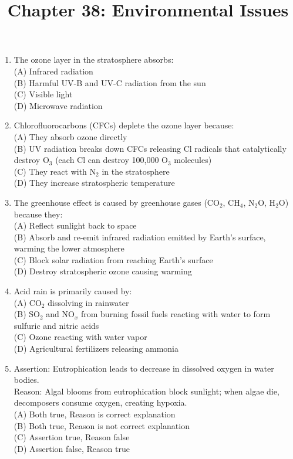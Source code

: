 \documentclass{article}
\begin{document}
\newpage
\title{Chapter 38: Environmental Issues}
\maketitle

\begin{enumerate}[label=Q\arabic*.]

\item The ozone layer in the stratosphere absorbs:
\\(A) Infrared radiation
\\(B) Harmful UV-B and UV-C radiation from the sun
\\(C) Visible light
\\(D) Microwave radiation

\item Chlorofluorocarbons (CFCs) deplete the ozone layer because:
\\(A) They absorb ozone directly
\\(B) UV radiation breaks down CFCs releasing Cl radicals that catalytically destroy O$_3$ (each Cl can destroy 100,000 O$_3$ molecules)
\\(C) They react with N$_2$ in the stratosphere
\\(D) They increase stratospheric temperature

\item The greenhouse effect is caused by greenhouse gases (CO$_2$, CH$_4$, N$_2$O, H$_2$O) because they:
\\(A) Reflect sunlight back to space
\\(B) Absorb and re-emit infrared radiation emitted by Earth's surface, warming the lower atmosphere
\\(C) Block solar radiation from reaching Earth's surface
\\(D) Destroy stratospheric ozone causing warming

\item Acid rain is primarily caused by:
\\(A) CO$_2$ dissolving in rainwater
\\(B) SO$_2$ and NO$_x$ from burning fossil fuels reacting with water to form sulfuric and nitric acids
\\(C) Ozone reacting with water vapor
\\(D) Agricultural fertilizers releasing ammonia

\item Assertion: Eutrophication leads to decrease in dissolved oxygen in water bodies.\\
Reason: Algal blooms from eutrophication block sunlight; when algae die, decomposers consume oxygen, creating hypoxia.
\\(A) Both true, Reason is correct explanation
\\(B) Both true, Reason is not correct explanation
\\(C) Assertion true, Reason false
\\(D) Assertion false, Reason true


\end{enumerate}
\end{document}
